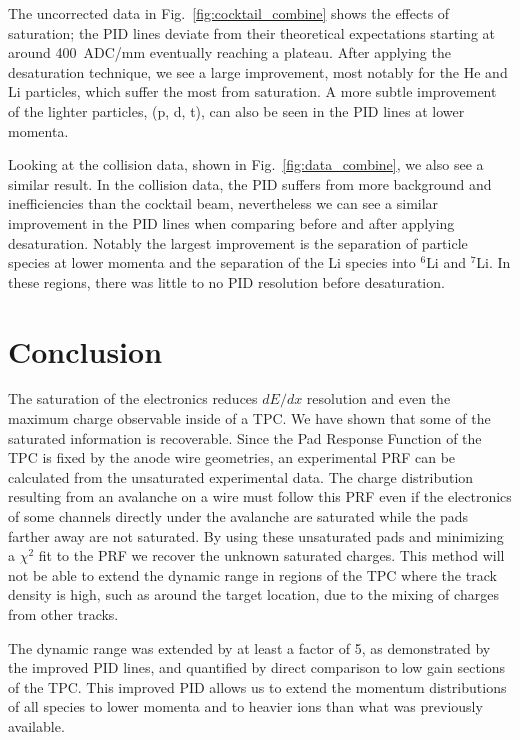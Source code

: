 \documentclass[review,number,sort&compress]{elsarticle}
\begin{document}
The uncorrected data in Fig.~\ref{fig:cocktail_combine} shows the effects of saturation; the PID lines deviate from their theoretical expectations starting at around 400~ADC/mm eventually reaching a plateau. After applying the desaturation technique, we see a large improvement, most notably for the He and Li particles, which suffer the most from saturation. A more subtle improvement of the lighter particles, (p, d, t), can also be seen in the PID lines at lower momenta.

Looking at the collision data, shown in Fig.~\ref{fig:data_combine}, we also see a similar result. In the collision data, the PID suffers from more background and inefficiencies than the cocktail beam, nevertheless we can see a similar improvement in the PID lines when comparing before and after applying desaturation. Notably the largest improvement is the separation of particle species at lower momenta and the separation of the Li species into ${}^{6}$Li and ${}^{7}$Li. In these regions, there was little to no PID resolution before desaturation. 

\clearpage

\section{Conclusion}

The saturation  of the electronics reduces $dE/dx$ resolution and even the maximum charge observable inside of a TPC.  We have shown that some of the saturated information is recoverable. Since the Pad Response Function of the TPC is fixed by the anode wire geometries, an experimental PRF can be calculated from the unsaturated experimental data. The charge distribution resulting from an avalanche on a wire must follow this PRF even if the electronics of some channels directly under the avalanche are saturated while the pads farther away are not saturated. By using these unsaturated pads and minimizing a $\chi^2$ fit  to the PRF we recover the unknown saturated charges. This method will not be able to extend the dynamic range in regions of the TPC where the track density is high, such as around the target location, due to the mixing of charges from other tracks. 

The dynamic range was extended by at least a factor of 5, as demonstrated by the improved PID lines, and quantified by direct comparison to low gain sections of the TPC. This improved PID allows us to extend the momentum distributions of all species to lower momenta and to heavier ions than what was previously available. 
\end{document}
